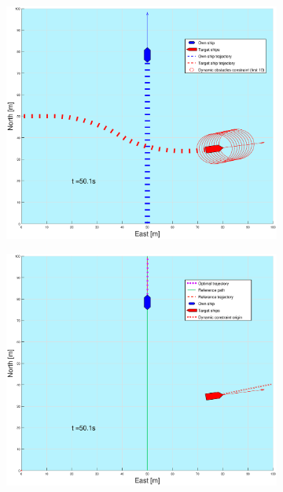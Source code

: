 \begin{figure}[ht]\ContinuedFloat
    \begin{subfigure}[b]{0.49\textwidth}
        \centering
        \includegraphics[width=\textwidth]{Images/Figures/enkel_SO/_Simple_0fig1_time=50}
    \end{subfigure}
    \hfill
    \begin{subfigure}[b]{0.499\textwidth}
        \centering
        \includegraphics[width=\textwidth]{Images/Figures/enkel_SO/_Simple_0fig999_time=50}

\end{subfigure}
\end{figure}
